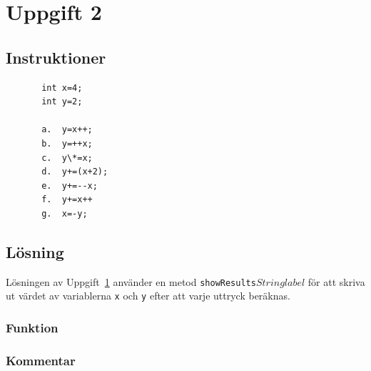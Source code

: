 \section{Uppgift 2}\label{sec:uppg02}

\subsection{Instruktioner}

\begin{verbatim}
       int x=4;
       int y=2;

       a.  y=x++;
       b.  y=++x;
       c.  y\*=x;
       d.  y+=(x+2);
       e.  y+=--x;
       f.  y+=x++
       g.  x=-y;
\end{verbatim}

\subsection{Lösning}
Lösningen av Uppgift~\ref{sec:uppg02} använder en metod
\texttt{showResults\(String label\)} för att skriva ut värdet av variablerna
\texttt{x} och \texttt{y} efter att varje uttryck beräknas.

\subsubsection{Funktion}

\subsubsection{Kommentar}

%


